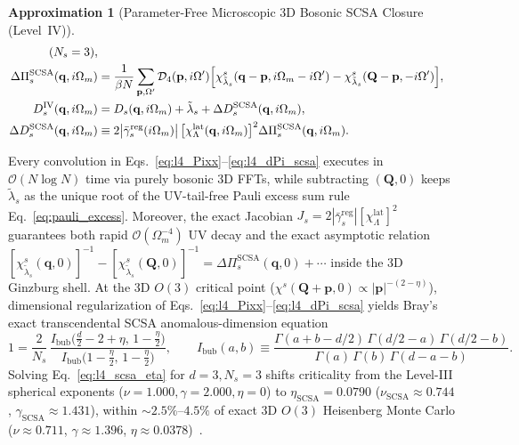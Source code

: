 \documentclass[11pt,a4paper]{article}
\numberwithin{equation}{section}
\theoremstyle{plain}
\theoremstyle{definition}
\newtheorem{approximation}{Approximation}[section]
\providecommand{\vq}{\mathbf{q}}
\providecommand{\vp}{\mathbf{p}}
\providecommand{\vQ}{\mathbf{Q}}
\begin{document}
\begin{approximation}[Parameter-Free Microscopic 3D Bosonic SCSA Closure (Level~IV)]
\begin{align}
    \qquad (N_s = 3),
    \label{eq:l4_D4} \\
    \Delta\Pi_s^{\mathrm{SCSA}}(\vq, i\Omega_m)
    &= \frac{1}{\beta N}\sum_{\vp,\Omega'} \mathcal{D}_4(\vp, i\Omega')
       \Bigl[\chi^s_{\tilde{\lambda}_s}(\vq - \vp, i\Omega_m - i\Omega')
             - \chi^s_{\tilde{\lambda}_s}(\vQ - \vp, -i\Omega')\Bigr],
    \label{eq:l4_dPi_scsa} \\
    D_s^{\mathrm{IV}}(\vq, i\Omega_m)
    &= D_s(\vq, i\Omega_m) + \tilde{\lambda}_s + \Delta D_s^{\mathrm{SCSA}}(\vq, i\Omega_m),
    \label{eq:l4_Ds_scsa} \\
    \Delta D_s^{\mathrm{SCSA}}(\vq, i\Omega_m)
    &\equiv 2\bigl|\bar{\gamma}_s^{\mathrm{reg}}(i\Omega_m)\bigr|\,
           \bigl[\chi_\Lambda^{\mathrm{lat}}(\vq, i\Omega_m)\bigr]^2
           \Delta\Pi_s^{\mathrm{SCSA}}(\vq, i\Omega_m).
    \label{eq:l4_Ds_jac}
\end{align}
\end{approximation}

Every convolution in Eqs.~\eqref{eq:l4_Pixx}--\eqref{eq:l4_dPi_scsa} executes in
$\mathcal{O}(N\log N)$ time via purely bosonic 3D FFTs, while subtracting $(\vQ, 0)$ keeps
$\tilde{\lambda}_s$ as the unique root of the UV-tail-free Pauli excess sum rule
Eq.~\eqref{eq:pauli_excess}. Moreover, the exact Jacobian
$J_s = 2|\bar{\gamma}_s^{\mathrm{reg}}|[\chi_\Lambda^{\mathrm{lat}}]^2$ guarantees both
rapid $\mathcal{O}(\Omega_m^{-4})$ UV decay and the exact asymptotic relation
$[\chi^s_{\tilde{\lambda}_s}(\vq, 0)]^{-1} - [\chi^s_{\tilde{\lambda}_s}(\vQ, 0)]^{-1}
= \Delta\Pi_s^{\mathrm{SCSA}}(\vq, 0) + \cdots$ inside the 3D Ginzburg shell. At the
3D $O(3)$ critical point ($\chi^s(\vQ+\vp,0) \propto |\vp|^{-(2-\eta)}$), dimensional
regularization of Eqs.~\eqref{eq:l4_Pixx}--\eqref{eq:l4_dPi_scsa} yields Bray's exact
transcendental SCSA anomalous-dimension equation~\cite{Bray1974}
\begin{equation}
    1 = \frac{2}{N_s}\,\frac{I_{\mathrm{bub}}\bigl(\frac{d}{2}-2+\eta,\, 1-\frac{\eta}{2}\bigr)}
                            {I_{\mathrm{bub}}\bigl(1-\frac{\eta}{2},\, 1-\frac{\eta}{2}\bigr)},
    \qquad
    I_{\mathrm{bub}}(a,b) \equiv \frac{\Gamma(a+b-d/2)\,\Gamma(d/2-a)\,\Gamma(d/2-b)}
                                      {\Gamma(a)\,\Gamma(b)\,\Gamma(d-a-b)}.
    \label{eq:l4_scsa_eta}
\end{equation}
Solving Eq.~\eqref{eq:l4_scsa_eta} for $d = 3, N_s = 3$ shifts criticality from the
Level-III spherical exponents ($\nu = 1.000, \gamma = 2.000, \eta = 0$) to
$\eta_{\mathrm{SCSA}} = 0.0790$ ($\nu_{\mathrm{SCSA}} \approx 0.744$,
$\gamma_{\mathrm{SCSA}} \approx 1.431$), within $\sim 2.5\%$--$4.5\%$ of exact 3D $O(3)$
Heisenberg Monte Carlo ($\nu \approx 0.711$, $\gamma \approx 1.396$, $\eta \approx 0.0378$)~\cite{Campostrini2002}.
\end{document}
